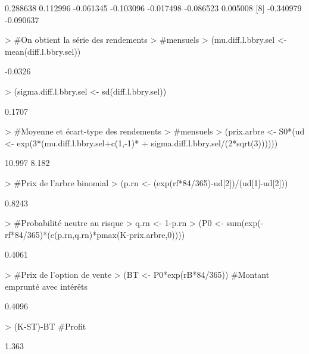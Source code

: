 \documentclass{article}
\begin{document}
\begin{Schunk}
\begin{Soutput}
[1]  0.288638  0.112996 -0.061345 -0.103096 -0.017498 -0.086523  0.005008
[8] -0.340979 -0.090637
\end{Soutput}
\begin{Sinput}
>                                         #On obtient la série des rendements
>                                         #mensuels
> (mu.diff.l.bbry.sel <- mean(diff.l.bbry.sel))
\end{Sinput}
\begin{Soutput}
[1] -0.0326
\end{Soutput}
\begin{Sinput}
> (sigma.diff.l.bbry.sel <- sd(diff.l.bbry.sel))
\end{Sinput}
\begin{Soutput}
[1] 0.1707
\end{Soutput}
\begin{Sinput}
>                                         #Moyenne et écart-type des rendements 
>                                         #mensuels
> (prix.arbre <- S0*(ud <- exp(3*(mu.diff.l.bbry.sel+c(1,-1)*
+                                 sigma.diff.l.bbry.sel/(2*sqrt(3))))))
\end{Sinput}
\begin{Soutput}
[1] 10.997  8.182
\end{Soutput}
\begin{Sinput}
>                                         #Prix de l'arbre binomial
> (p.rn <- (exp(rf*84/365)-ud[2])/(ud[1]-ud[2]))
\end{Sinput}
\begin{Soutput}
[1] 0.8243
\end{Soutput}
\begin{Sinput}
>                                         #Probabilité neutre au risque
> q.rn <- 1-p.rn
> (P0 <- sum(exp(-rf*84/365)*(c(p.rn,q.rn)*pmax(K-prix.arbre,0))))
\end{Sinput}
\begin{Soutput}
[1] 0.4061
\end{Soutput}
\begin{Sinput}
>                                         #Prix de l'option de vente
> (BT <- P0*exp(rB*84/365)) #Montant emprunté avec intérêts
\end{Sinput}
\begin{Soutput}
[1] 0.4096
\end{Soutput}
\begin{Sinput}
> (K-ST)-BT  #Profit
\end{Sinput}
\begin{Soutput}
[1] 1.363
\end{Soutput}
\end{Schunk}
\end{document}
